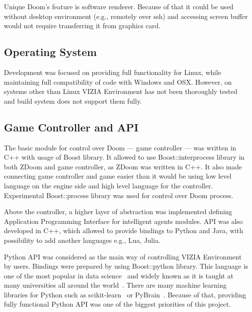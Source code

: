 Unique Doom's feature is software renderer. Because of that it could be used without desktop environment (e.g., remotely over ssh) and accessing screen buffer would not require transferring it from graphics card.

\subsection{Operating System}

Development was focused on providing full functionality for Linux, while maintaining full compatibility of code with Windows and OSX. 
However, on systems other than Linux VIZIA Environment has not been thoroughly tested and build system does not support them fully.


\subsection{Game Controller and API}


The basic module for control over Doom --- game controller --- was written in C++ with usage of Boost library.
It allowed to use Boost::interprocess library in both ZDoom and game controller, as ZDoom was written in C++.
It also made connecting game controller and game easier than it would be using low level language on the engine side and high level language for the controller.
Experimental Boost::process library was used for control over Doom process.


Above the controller, a higher layer of abstraction was implemented defining Application Programming Interface for intelligent agents modules.
API was also developed in C++, which allowed to provide bindings to Python and Java, with possibility to add another languages e.g., Lua, Julia.


Python API was considered as the main way of controlling VIZIA Environment by users.
Bindings were prepared by using Boost::python library.
This language is one of the most popular in data science~\cite{ds_lang} and widely known as it is taught at many universities all around the world~\cite{pythons_schools}.
There are many machine learning libraries for Python such as scikit-learn~\cite{scikit} or PyBrain~\cite{pybrain}.
Because of that, providing fully functional Python API was one of the biggest priorities of this project.


